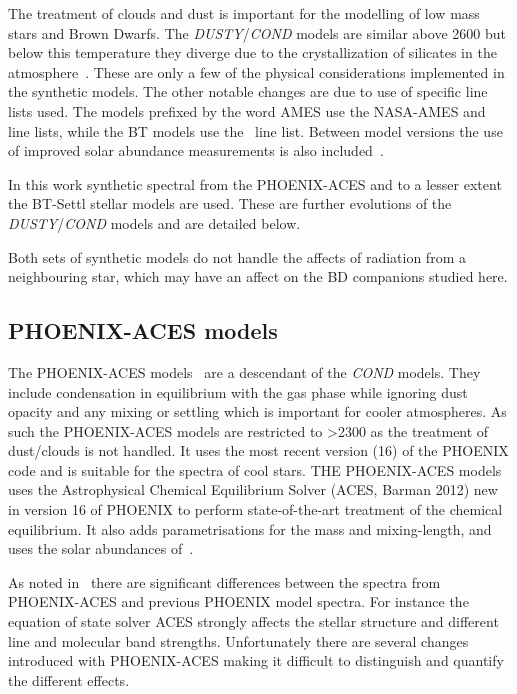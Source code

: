The treatment of clouds and dust is important for the modelling of low mass stars and Brown Dwarfs.
The \emph{DUSTY}/\emph{COND} models are similar above 2600\K{} but below this temperature they diverge due to the crystallization of silicates in the atmosphere~\citep{allard_limiting_2001}.
These are only a few of the physical considerations implemented in the synthetic models.
The other notable changes are due to use of specific line lists used.
The models prefixed by the word {AMES} use the {NASA-AMES}  and  line lists, while the {BT} models use the~\citet{barber_highaccuracy_2006}  line list.
Between model versions the use of improved solar abundance measurements is also included~\citep[][]{asplund_chemical_2009}.

In this work synthetic spectral from the {PHOENIX-ACES} and to a lesser extent the {BT-Settl} stellar models are used.
These are further evolutions of the \emph{DUSTY}/\emph{COND} models and are detailed below.

Both sets of synthetic models do not handle the affects of radiation from a neighbouring star, which may have an affect on the {BD} companions studied here.

\subsection{{PHOENIX-ACES} models}
\label{subsec:phoenix_aces}

The {PHOENIX-ACES} models~\citep{husser_new_2013} are a descendant of the \emph{COND} models.
They include condensation in equilibrium with the gas phase while ignoring dust opacity and any mixing or settling which is important for cooler atmospheres.
As such the {PHOENIX-ACES} models are restricted to \Teff{}>2300\K{} as the treatment of dust/clouds is not handled.
It uses the most recent version (16) of the {PHOENIX} code and is suitable for the spectra of cool stars.
THE {PHOENIX-ACES} models uses the Astrophysical Chemical Equilibrium Solver (ACES, Barman 2012) new in version 16 of {PHOENIX} to perform state-of-the-art treatment of the chemical equilibrium.
It also adds parametrisations for the mass and mixing-length, and uses the solar abundances of~\citet{asplund_chemical_2009}.

As noted in~\citet{husser_new_2013} there are significant differences between the spectra from {PHOENIX-ACES} and previous {PHOENIX} model spectra.
For instance the equation of state solver ACES strongly affects the stellar structure and different line and molecular band strengths.
Unfortunately there are several changes introduced with {PHOENIX-ACES} making it difficult to distinguish and quantify the different effects.

